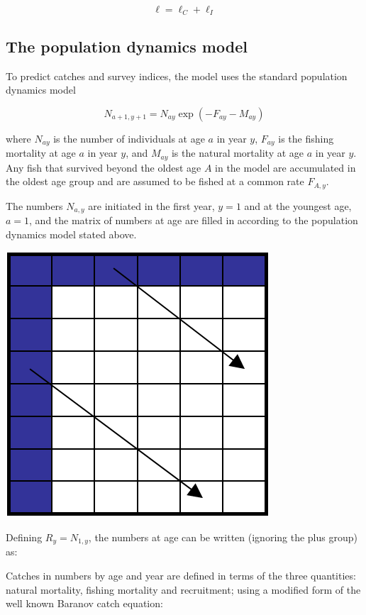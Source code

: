 \documentclass[
]{book}
\begin{document}
\[\ell = \ell_C + \ell_I\]

\hypertarget{the-population-dynamics-model}{%
\subsection{The population dynamics model}\label{the-population-dynamics-model}}

To predict catches and survey indices, the model uses the standard population dynamics model

\[N_{a+1,y+1} = N_{ay} \exp \left( - F_{ay} - M_{ay} \right)\]

where \(N_{ay}\) is the number of individuals at age \(a\) in year \(y\), \(F_{ay}\) is the fishing mortality at age \(a\) in year \(y\), and \(M_{ay}\) is the natural mortality at age \(a\) in year \(y\). Any fish that survived beyond the oldest age \(A\) in the model are accumulated in the oldest age group and are assumed to be fished at a common rate \(F_{A,y}\).


The numbers \(N_{a,y}\) are initiated in the first year, \(y=1\) and at the youngest age, \(a=1\), and the matrix of numbers at age are filled in according to the population dynamics model stated above.

\includegraphics{figure/sca_matrix.png}

Defining \(R_y = N_{1,y}\), the numbers at age can be written (ignoring the plus group) as:

Catches in numbers by age and year are defined in terms of the three quantities: natural mortality, fishing mortality and recruitment; using a modified form of the well known Baranov catch equation:
\end{document}
